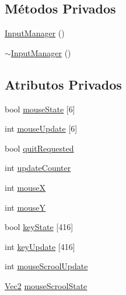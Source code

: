 \subsection*{Métodos Privados}
\begin{DoxyCompactItemize}
\item 
\hyperlink{classInputManager_a8be46886da639b26d67181c29dab6d6c}{Input\+Manager} ()
\item 
\hyperlink{classInputManager_af518290877dd183606709d5852db5491}{$\sim$\+Input\+Manager} ()
\end{DoxyCompactItemize}
\subsection*{Atributos Privados}
\begin{DoxyCompactItemize}
\item 
bool \hyperlink{classInputManager_af0f48b36a7d8e0f2c0b24057143b29c7}{mouse\+State} \mbox{[}6\mbox{]}
\item 
int \hyperlink{classInputManager_a1226f8af91792ac5ac5adda5fa2f0db0}{mouse\+Update} \mbox{[}6\mbox{]}
\item 
bool \hyperlink{classInputManager_a078d1f2f8af5f17005f21f7407dbca57}{quit\+Requested}
\item 
int \hyperlink{classInputManager_a96541a9ebd43184f92449f9daf94724f}{update\+Counter}
\item 
int \hyperlink{classInputManager_a29fddcf9d741e4de04492ad76b7cb3af}{mouse\+X}
\item 
int \hyperlink{classInputManager_afb189c58dd5ee470a3202c685c5c7f1e}{mouse\+Y}
\item 
bool \hyperlink{classInputManager_a3c6b0a27b387bfb4b2fc669db0f68bad}{key\+State} \mbox{[}416\mbox{]}
\item 
int \hyperlink{classInputManager_ae8ce3bc2865693cbb548ef2f1603f991}{key\+Update} \mbox{[}416\mbox{]}
\item 
int \hyperlink{classInputManager_a646fc44d21853e1354aaacc6a27e79ca}{mouse\+Scrool\+Update}
\item 
\hyperlink{classVec2}{Vec2} \hyperlink{classInputManager_a9c9d5ed1da1b205d9311ec4a9bab06ea}{mouse\+Scrool\+State}
\end{DoxyCompactItemize}


